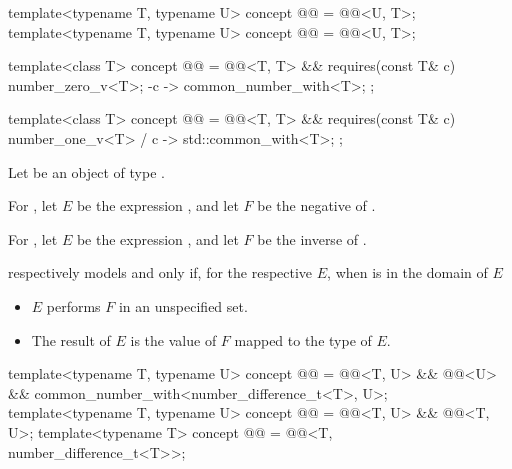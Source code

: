 \begin{itemdecl}
template<typename T, typename U>
concept @@ = @@<U, T>;
template<typename T, typename U>
concept @@ = @@<U, T>;
\end{itemdecl}

\begin{itemdecl}
template<class T> concept @@ =
  @@<T, T> &&
  requires(const T& c) {
    number_zero_v<T>;
    { -c } -> common_number_with<T>;
  };

template<class T> concept @@ =
  @@<T, T> &&
  requires(const T& c) {
    { number_one_v<T> / c } -> std::common_with<T>;
  };
\end{itemdecl}

\begin{itemdescr}
\pnum
Let  be an object of type .

\pnum
For ,
let $E$ be the expression , and
let $F$ be the negative of .

\pnum
For ,
let $E$ be the expression , and
let $F$ be the inverse of .

\pnum
{} respectively models
 and
only if, for the respective $E$, when  is in the domain of $E$
\begin{itemize}
\item
$E$ performs $F$ in an unspecified set.
\item
The result of $E$ is the value of $F$ mapped to the type of $E$.
\end{itemize}
\end{itemdescr}

\begin{itemdecl}
template<typename T, typename U>
concept @@ =
  @@<T, U> && @@<U> && common_number_with<number_difference_t<T>, U>;
template<typename T, typename U>
concept @@ = @@<T, U> && @@<T, U>;
template<typename T>
concept @@ = @@<T, number_difference_t<T>>;
\end{itemdecl}

